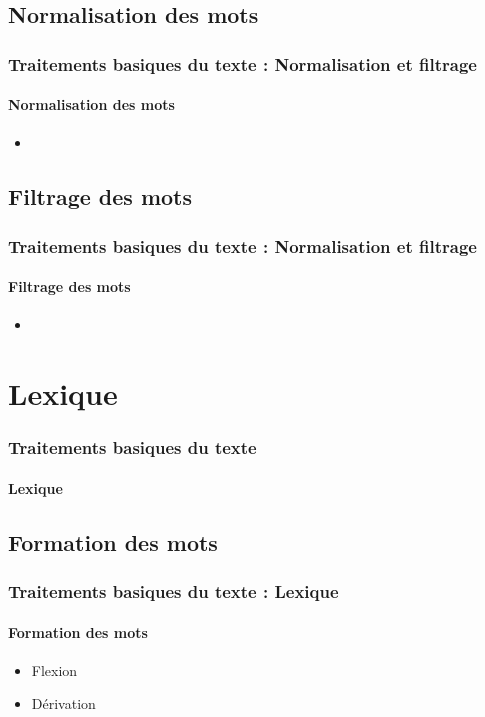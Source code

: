 \documentclass[xcolor=table]{beamer}
\begin{document}
\subsection{Normalisation des mots}

\begin{frame}
\frametitle{Traitements basiques du texte : Normalisation et filtrage}
\framesubtitle{Normalisation des mots}

\begin{itemize}
\item 
\end{itemize}

\end{frame}

\subsection{Filtrage des mots}

\begin{frame}
\frametitle{Traitements basiques du texte : Normalisation et filtrage}
\framesubtitle{Filtrage des mots}

\begin{itemize}
\item 
\end{itemize}

\end{frame}

\section{Lexique}

\begin{frame}
\frametitle{Traitements basiques du texte}
\framesubtitle{Lexique}


\end{frame}

\subsection{Formation des mots}

\begin{frame}
\frametitle{Traitements basiques du texte : Lexique}
\framesubtitle{Formation des mots}

\begin{itemize}
\item Flexion
\item Dérivation
\end{itemize}

\end{frame}
\end{document}
